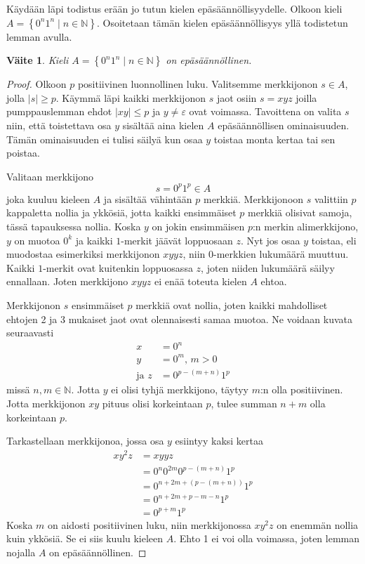 \documentclass[a4paper,11pt]{article}
\newtheorem*{claim}{Väite}
\theoremstyle{definition}
\newcommand{\set}[1]{{\left\{ #1 \right\}}}
\newcommand{\Nat}{\mathbb{N}}
\begin{document}
Käydään läpi todistus erään jo tutun kielen epä\-sään\-nöl\-li\-syy\-del\-le.
Olkoon kieli $A = \set{0^n1^n \mid n \in \Nat}$. Osoitetaan tämän kielen
epäsäännöllisyys yllä todistetun lemman avulla.
%
\begin{claim}
    Kieli $A = \set{0^n1^n \mid n \in \Nat}$ on epäsäännöllinen.
\end{claim}
\begin{proof}
    Olkoon $p$ positiivinen luonnollinen luku. Valitsemme merkkijonon $s \in
    A$, jolla $|s| \geq p$. Käymmä läpi kaikki merkkijonon $s$ jaot osiin $s =
    xyz$ joilla pumppauslemman ehdot $|xy| \leq p$ ja $y \neq \varepsilon$ ovat
    voimassa.  Tavoittena on valita $s$ niin, että toistettava osa $y$ sisältää
    aina kielen $A$ epäsäännöllisen ominaisuuden.  Tämän ominaisuuden ei tulisi
    säilyä kun osaa $y$ toistaa monta kertaa tai sen poistaa.

    Valitaan merkkijono
    \begin{equation*}
        s = 0^p1^p \in A
    \end{equation*}
    joka kuuluu kieleen $A$ ja sisältää vähintään $p$ merkkiä. Merkkijonoon $s$
    valittiin $p$ kappaletta nollia ja ykkösiä, jotta kaikki ensimmäiset $p$
    merkkiä olisivat samoja, tässä tapauksessa nollia. Koska $y$ on jokin
    ensimmäisen $p$:n merkin alimerkkijono, $y$ on muotoa $0^k$ ja kaikki
    $1$-merkit jäävät loppuosaan $z$. Nyt jos osaa $y$ toistaa, eli muodostaa
    esimerkiksi merkkijonon $xyyz$, niin $0$-merkkien lukumäärä muuttuu. Kaikki
    $1$-merkit ovat kuitenkin loppuosassa $z$, joten niiden lukumäärä säilyy
    ennallaan. Joten merkkijono $xyyz$ ei enää toteuta kielen $A$ ehtoa.

    Merkkijonon $s$ ensimmäiset $p$ merkkiä ovat nollia, joten kaikki
    mahdolliset ehtojen 2 ja 3 mukaiset jaot ovat olennaisesti samaa muotoa.
    Ne voidaan kuvata seuraavasti
    \begin{align*}
      x & = 0^n \\
      y & = 0^m\text{, } m > 0 \\
      \text{ja } z & = 0^{p-(m+n)}1^p
    \end{align*}
    missä $n,m \in \Nat$.
    Jotta $y$ ei olisi tyhjä merkkijono, täytyy $m$:n olla positiivinen. Jotta
    merkkijonon $xy$ pituus olisi korkeintaan $p$, tulee summan $n + m$ olla
    korkeintaan $p$.
    
    Tarkastellaan merkkijonoa, jossa osa $y$ esiintyy kaksi kertaa
    \begin{align*}
      xy^2z & = xyyz \\
      & = 0^n0^{2m}0^{p-(m+n)}1^p \\
      & = 0^{n+2m+(p-(m+n))}1^p \\
      & = 0^{n+2m+p-m-n}1^p \\
      & = 0^{p+m}1^p
    \end{align*}
    Koska $m$ on aidosti positiivinen luku, niin merkkijonossa $xy^2z$ on
    enemmän nollia kuin ykkösiä. Se ei siis kuulu kieleen $A$. Ehto 1 ei
    voi olla voimassa, joten lemman nojalla $A$ on epä\-sään\-nöl\-li\-nen.
\end{proof}
\end{document}
